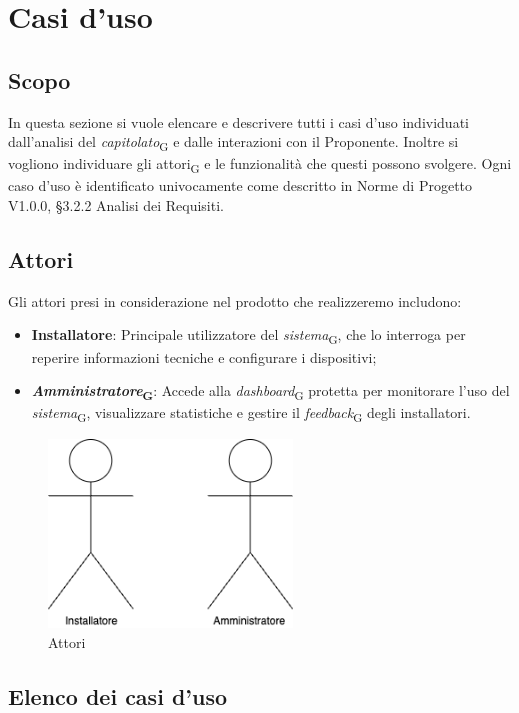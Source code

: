\section{Casi d'uso}
\subsection{Scopo}
In questa sezione si vuole elencare e descrivere tutti i casi d'uso individuati dall'analisi del \textit{capitolato}\textsubscript{G} e dalle interazioni con il Proponente. Inoltre si vogliono individuare gli attori\textsubscript{G} e le funzionalità che questi possono svolgere. Ogni caso d'uso è identificato univocamente come descritto in Norme di Progetto V1.0.0,  §3.2.2 Analisi dei Requisiti.

\subsection{Attori}
Gli attori presi in considerazione nel prodotto che realizzeremo includono:
\begin{itemize}
    \item \textbf{Installatore}: Principale utilizzatore del \textit{sistema}\textsubscript{G}, che lo interroga per reperire informazioni tecniche e configurare i dispositivi; 
    \item \textbf{\textit{Amministratore}\textsubscript{G}}: Accede alla \textit{dashboard}\textsubscript{G} protetta per monitorare l’uso del \textit{sistema}\textsubscript{G}, visualizzare statistiche e gestire il \textit{feedback}\textsubscript{G} degli installatori.
\end{itemize}
\begin{figure}[H]
\centering
\includegraphics[height=5cm]{contents/casi_duso/png/attori.png}
\caption{Attori}
\end{figure}

\subsection{Elenco dei casi d'uso}
